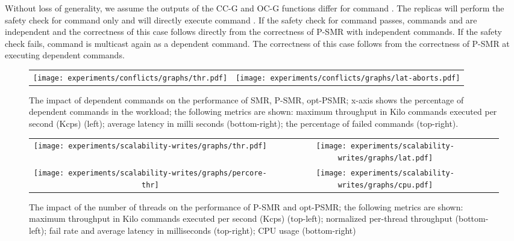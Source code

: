 \documentclass[conference]{IEEEtran}
\newcommand{\sizefactor}{0.9}
\begin{document}
Without loss of generality, we assume the outputs of the CC-G and OC-G functions differ for command . 
The replicas will perform the safety check for command  only and will directly execute command . 
If the safety check for command  passes, commands  and  are independent and the correctness of this case follows directly from the correctness of P-SMR with independent commands. 
If the safety check fails, command  is multicast again as a dependent command. 
The correctness of this case follows from the correctness of P-SMR at executing dependent commands. 
















\begin{figure*}[t]
  \begin{center}
    \begin{tabular}{cc}
      \texttt{[image: experiments/conflicts/graphs/thr.pdf]}&
       \texttt{[image: experiments/conflicts/graphs/lat-aborts.pdf]}\\
    \end{tabular}
    \caption{The impact of dependent commands on the performance of SMR, P-SMR, opt-PSMR; x-axis  shows the percentage of dependent commands in the workload; the following metrics are shown: maximum throughput in Kilo commands executed per second (Kcps) (left);  average latency in milli seconds (bottom-right); the percentage of failed commands (top-right).}
    \label{fig:mixed-workloads}
 \end{center}
\end{figure*}

\begin{figure*}[ht]
  \begin{center}
    \begin{tabular}{cc}
      \texttt{[image: experiments/scalability-writes/graphs/thr.pdf]}&
       \texttt{[image: experiments/scalability-writes/graphs/lat.pdf]}\\
      \texttt{[image: experiments/scalability-writes/graphs/percore-thr]}&
       \texttt{[image: experiments/scalability-writes/graphs/cpu.pdf]}\\
       
    \end{tabular}
    \caption{The impact of the number of threads on the performance of P-SMR and opt-PSMR; the following metrics are shown: maximum throughput in Kilo commands executed per second (Kcps) (top-left); normalized per-thread throughput (bottom-left); fail rate and average latency in milliseconds (top-right); CPU usage (bottom-right)}
    \label{fig:scalability:writes}
 \end{center}
\end{figure*}
\end{document}
